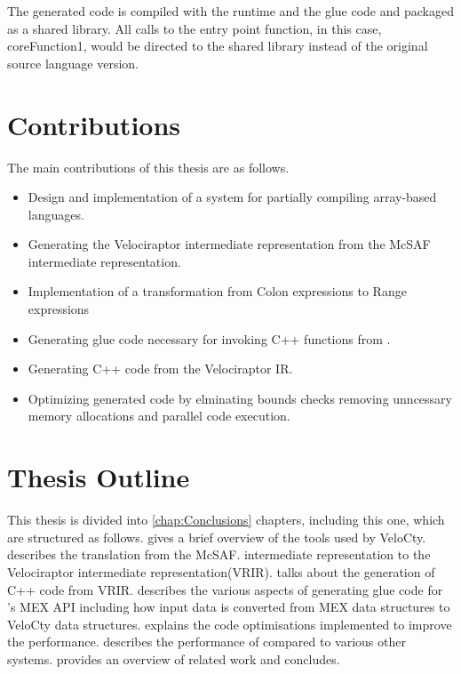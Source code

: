 The generated code is compiled with the runtime and the glue code and packaged as a shared library. All calls to the entry point function, in this case, coreFunction1, would be directed to the shared library instead of the original source language version.\\
\section{Contributions}
The main contributions of this thesis are as follows.
\begin{itemize}
\item Design and implementation of a system for partially compiling array-based languages. 
\item Generating the Velociraptor intermediate representation from the McSAF intermediate representation. 
\item Implementation of a transformation from  Colon expressions to Range expressions
\item Generating glue code necessary for invoking C++ functions from \matlab.
\item Generating C++ code from the Velociraptor IR.
\item Optimizing generated code by elminating bounds checks removing unncessary memory allocations and parallel code execution.
\end{itemize}
\section{Thesis Outline}
This thesis is divided into \ref{chap:Conclusions} chapters, including this one, which are structured as follows.
 gives a brief overview of the tools
used by VeloCty.
 describes the translation from the McSAF.
intermediate representation to the Velociraptor intermediate representation(VRIR).
 talks about the generation of C++ code from VRIR.
 describes the various aspects of generating glue code for \matlab's MEX API including how input data is converted from MEX data structures to VeloCty data structures. 
 explains the code optimisations implemented to improve the performance. 
 describes the performance of \velocty compared to various other systems. 
 provides an overview of related work and
 concludes.
